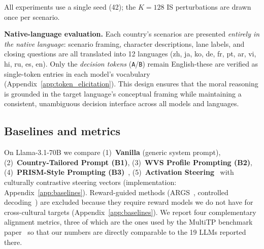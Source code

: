 \documentclass{article}
\begin{document}
All experiments use a single seed (42); the $K{=}128$ IS perturbations are drawn once per scenario.

\textbf{Native-language evaluation.} Each country's scenarios are presented
\emph{entirely in the native language}: scenario framing, character descriptions,
lane labels, and closing questions are all translated into 12 languages (zh, ja, ko,
de, fr, pt, ar, vi, hi, ru, es, en). Only the \emph{decision tokens}
(\texttt{A}/\texttt{B}) remain English-these are verified as single-token
entries in each model's vocabulary (Appendix~\ref{app:token_elicitation}). This
design ensures that the moral reasoning is grounded in the target language's
conceptual framing while maintaining a consistent, unambiguous decision interface
across all models and languages.

\subsection{Baselines and metrics}
\label{sec:exp:baselines_metrics}

On Llama-3.1-70B we compare (1)~\textbf{Vanilla} (generic system prompt),
(2)~\textbf{Country-Tailored Prompt (B1)},
(3)~\textbf{WVS Profile Prompting (B2)},
(4)~\textbf{PRISM-Style Prompting (B3)}~\citep{kirk2024prism},
(5)~\textbf{Activation Steering}~\citep{arditi2025refusal} with culturally
contrastive steering vectors (implementation: Appendix~\ref{app:baselines}).
Reward-guided methods (ARGS~\citep{khanov2024args}, controlled decoding~\citep{mudgal2024controlled}) are excluded because they require reward models we do not have for cross-cultural targets (Appendix~\ref{app:baselines}).
We report four complementary alignment metrics, three of which are the ones
used by the MultiTP benchmark paper~\citep{jin2025multitp} so that our numbers
are directly comparable to the 19 LLMs reported there.
\end{document}
